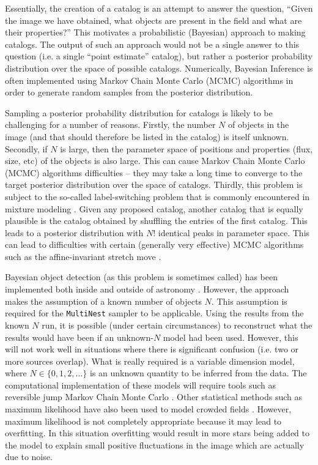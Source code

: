 \documentclass[manuscript]{aastex}
\begin{document}
Essentially, the creation of a catalog is an attempt to answer the question,
``Given the image we have obtained, what objects are present in the field and
what are their properties?'' This motivates a probabilistic (Bayesian)
approach to making catalogs. The output of such an approach would not be a
single answer to this question (i.e. a single ``point estimate'' catalog), but
rather a posterior probability distribution over the space of possible catalogs.
Numerically, Bayesian Inference is often implemented using Markov Chain Monte
Carlo (MCMC) algorithms in order to generate random samples from the posterior
distribution.

Sampling a posterior probability distribution for catalogs is likely to be
challenging for a number of reasons. Firstly, the number $N$ of objects in the
image (and that should therefore be listed in the catalog) is itself unknown.
Secondly, if $N$ is large, then the parameter space
of positions and properties (flux, size, etc) of the objects is also large.
This can cause Markov Chain Monte Carlo (MCMC) algorithms difficulties -- they
may take a long time to converge to the target posterior distribution over
the space of catalogs. Thirdly, this problem is subject to the so-called
label-switching problem that is commonly encountered in mixture modeling
\citep[e.g.][]{label_switching}. Given any proposed catalog, another catalog that is
equally plausible is the catalog obtained by shuffling the entries of the first
catalog. This leads to a posterior distribution with $N!$ identical peaks in
parameter space. This can lead to difficulties with certain (generally very
effective) MCMC algorithms such as the affine-invariant stretch move
\citep{goodman, emcee}.

Bayesian object detection (as this problem is sometimes called) has been
implemented both inside and outside of astronomy
\citep[e.g.][]{object, 2011MNRAS.415.3462F}. However, the
\citet{2011MNRAS.415.3462F} approach makes the assumption of a
known number of objects $N$.
This assumption is required for the
{\tt MultiNest} sampler \citep{multinest} to be applicable.
Using the results from the known $N$
run, it is possible (under certain circumstances) to reconstruct what the
results would have been if an unknown-$N$ model had been used. However,
this will not work well in situations where there is significant confusion
(i.e. two or more sources overlap). What is really required is a variable
dimension model, where $N \in \{0, 1, 2, ... \}$ is an unknown quantity to be
inferred from the data.
The computational implementation of these models will require tools such as
reversible jump Markov Chain Monte Carlo \citep{rjmcmc}. Other statistical
methods such as maximum likelihood have also been used to model crowded fields
\citep[e.g.][]{irwin}. However, maximum likelihood is not completely appropriate
because it may lead to overfitting. In this situation overfitting would result
in more stars being added to the model to explain small positive fluctuations
in the image which are actually due to noise.
\end{document}
